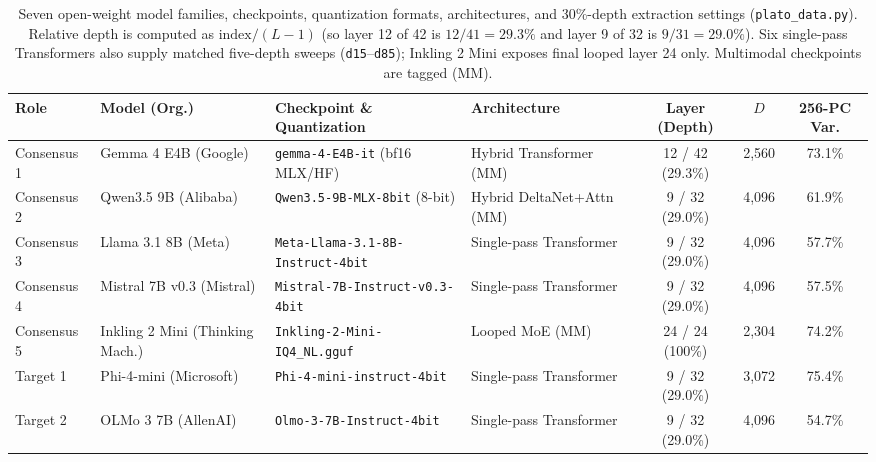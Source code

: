 \documentclass[conference]{IEEEtran}
\begin{document}
\begin{table}[t]
\centering
\caption{Seven open-weight model families, checkpoints, quantization formats, architectures, and 30\%-depth extraction settings (\texttt{plato\_data.py}). Relative depth is computed as $\text{index}/(L-1)$ (so layer 12 of 42 is $12/41=29.3\%$ and layer 9 of 32 is $9/31=29.0\%$). Six single-pass Transformers also supply matched five-depth sweeps (\texttt{d15}--\texttt{d85}); Inkling 2 Mini exposes final looped layer 24 only. Multimodal checkpoints are tagged (MM).}
\label{tab:models}
\scriptsize
\setlength{\tabcolsep}{2.4pt}
\begin{tabular}{@{}ll>{\raggedright\arraybackslash}p{4.3cm}>{\raggedright\arraybackslash}p{2.9cm}ccc@{}}
\toprule
\textbf{Role} & \textbf{Model (Org.)} & \textbf{Checkpoint \& Quantization} & \textbf{Architecture} & \textbf{Layer (Depth)} & \textbf{$D$} & \textbf{256-PC Var.} \\
\midrule
Consensus 1 & Gemma 4 E4B (Google) \cite{gemmateam2026gemma4} & \texttt{gemma-4-E4B-it} (bf16 MLX/HF) & Hybrid Transformer (MM) & 12 / 42 (29.3\%) & 2,560 & 73.1\% \\
Consensus 2 & Qwen3.5 9B (Alibaba) \cite{qwen2026qwen35} & \texttt{Qwen3.5-9B-MLX-8bit} (8-bit) & Hybrid DeltaNet+Attn (MM) & 9 / 32 (29.0\%) & 4,096 & 61.9\% \\
Consensus 3 & Llama 3.1 8B (Meta) \cite{grattafiori2024llama3} & \texttt{Meta-Llama-3.1-8B-Instruct-4bit} & Single-pass Transformer & 9 / 32 (29.0\%) & 4,096 & 57.7\% \\
Consensus 4 & Mistral 7B v0.3 (Mistral) \cite{jiang2023mistral} & \texttt{Mistral-7B-Instruct-v0.3-4bit} & Single-pass Transformer & 9 / 32 (29.0\%) & 4,096 & 57.5\% \\
Consensus 5 & Inkling 2 Mini (Thinking Mach.) \cite{thinkingmachines2026inkling} & \texttt{Inkling-2-Mini-IQ4\_NL.gguf} & Looped MoE (MM) & 24 / 24 (100\%) & 2,304 & 74.2\% \\
\midrule
Target 1 & Phi-4-mini (Microsoft) \cite{abouelenin2025phi4mini} & \texttt{Phi-4-mini-instruct-4bit} & Single-pass Transformer & 9 / 32 (29.0\%) & 3,072 & 75.4\% \\
Target 2 & OLMo 3 7B (AllenAI) \cite{olmo2025olmo3,walsh2025olmo2} & \texttt{Olmo-3-7B-Instruct-4bit} & Single-pass Transformer & 9 / 32 (29.0\%) & 4,096 & 54.7\% \\
\bottomrule
\end{tabular}
\end{table}
\end{document}
